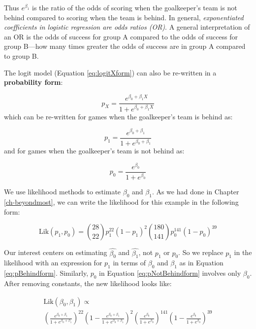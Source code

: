 \documentclass[
]{krantz}
\newcommand{\Lik}{\mathrm{Lik}}
\begin{document}
Thus \(e^{\beta_1}\) is the ratio of the odds of scoring when the goalkeeper's team is not behind compared to scoring when the team is behind. In general, \emph{exponentiated coefficients in logistic regression are odds ratios (OR)}. A general interpretation of an OR is the odds of success for group A compared to the odds of success for group B---how many times greater the odds of success are in group A compared to group B.

The logit model (Equation \eqref{eq:logitXform}) can also be re-written in a \textbf{probability form}:

\begin{equation*} 
p_X=\frac{e^{\beta_0+\beta_1X}}{1+e^{\beta_0+\beta_1X}}
\end{equation*}
which can be re-written for games when the goalkeeper's team is behind as:

\begin{equation} 
p_1=\frac{e^{\beta_0+\beta_1}}{1+e^{\beta_0+\beta_1}}  
\label{eq:pBehindform}
\end{equation}
and for games when the goalkeeper's team is not behind as:

\begin{equation} 
p_0=\frac{e^{\beta_0}}{1+e^{\beta_0}}
\label{eq:pNotBehindform}
\end{equation}

We use likelihood methods to estimate \(\beta_0\) and \(\beta_1\). As we had done in Chapter \ref{ch-beyondmost}, we can write the likelihood for this example in the following form:

\[\Lik(p_1, p_0) = {28 \choose 22}p_1^{22}(1-p_1)^{2}
{180 \choose 141}p_0^{141}(1-p_0)^{39}\]

Our interest centers on estimating \(\hat{\beta_0}\) and \(\hat{\beta_1}\), not \(p_1\) or \(p_0\). So we replace \(p_1\) in the likelihood with an expression for \(p_1\) in terms of \(\beta_0\) and \(\beta_1\) as in Equation \eqref{eq:pBehindform}. Similarly, \(p_0\) in Equation \eqref{eq:pNotBehindform} involves only \(\beta_0\). After removing constants, the new likelihood looks like:

\begin{equation*}
\begin{gathered}
    \Lik(\beta_0,\beta_1) \propto \\
    \left( \frac{e^{\beta_0+\beta_1}}{1+e^{\beta_0+\beta_1}}\right)^{22}\left(1- \frac{e^{\beta_0+\beta_1}}{1+e^{\beta_0+\beta_1}}\right)^{2}
    \left(\frac{e^{\beta_0}}{1+e^{\beta_0}}\right)^{141}\left(1-\frac{e^{\beta_0}}{1+e^{\beta_0}}\right)^{39}
\end{gathered}
\end{equation*}
\end{document}
